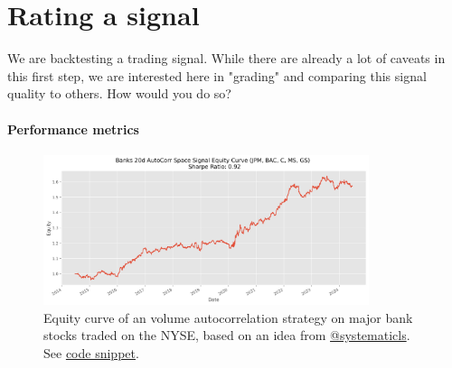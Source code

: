\section{Rating a signal}

\begin{tcolorbox}[width=\linewidth, sharp corners=all, colback=white!95!black]
We are backtesting a trading signal. While there are already a lot of caveats in this first step, we are interested here in "grading" and comparing this signal quality to others. How would you do so?
\end{tcolorbox}

\paragraph*{Performance metrics}



\begin{figure}[H]
    \includegraphics[width=0.85\textwidth]{include/img/banks_statarb_equity_curve.png}
    \centering
    \caption{Equity curve of an volume autocorrelation strategy on major bank stocks traded on the NYSE, based on an idea from \href{https://x.com/systematicls/status/1802666506125558115}{@systematicls}. See \href{https://github.com/vtisserand/quant_itws/tree/main/code/snippet/bank_statarb_signal.py}{code snippet}.}
    \label{fig:banks_equity_curve}
\end{figure}

